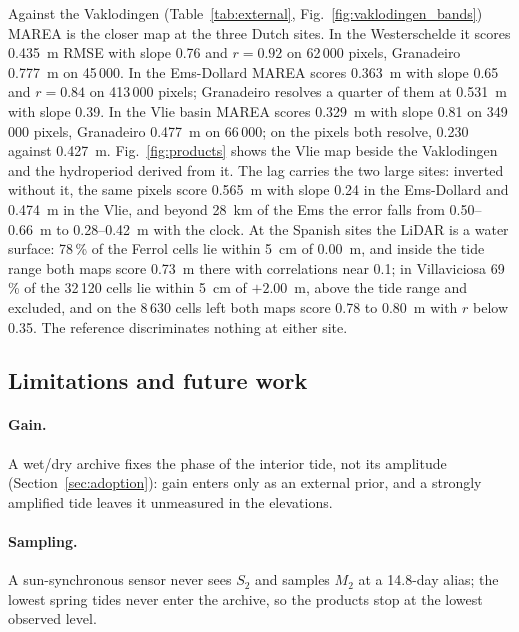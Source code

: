 

Against the Vaklodingen (Table~\ref{tab:external},
Fig.~\ref{fig:vaklodingen_bands}) MAREA is the closer map at the three
Dutch sites. In the Westerschelde it scores 0.435~m RMSE with slope 0.76
and $r = 0.92$ on 62\,000 pixels, Granadeiro 0.777~m on 45\,000. In the
Ems-Dollard MAREA scores 0.363~m with slope 0.65 and $r = 0.84$ on
413\,000 pixels; Granadeiro resolves a quarter of them at 0.531~m with
slope 0.39. In the Vlie basin MAREA scores 0.329~m with slope 0.81 on
349\,000 pixels, Granadeiro 0.477~m on 66\,000; on the pixels both
resolve, 0.230 against 0.427~m. Fig.~\ref{fig:products} shows the Vlie
map beside the Vaklodingen and the hydroperiod derived from it. The lag
carries the two large sites:
inverted without it, the same pixels score 0.565~m with slope 0.24 in
the Ems-Dollard and 0.474~m in the Vlie, and beyond 28~km of the Ems the
error falls from 0.50--0.66~m to 0.28--0.42~m with the clock.
At the Spanish sites the LiDAR is a water surface: 78\,\% of the Ferrol
cells lie within 5~cm of 0.00~m, and inside the tide range both maps
score 0.73~m there with correlations near 0.1; in Villaviciosa 69\,\% of
the 32\,120 cells lie within 5~cm of $+2.00$~m, above the tide range
and excluded, and on the 8\,630 cells left both maps score 0.78 to
0.80~m with $r$ below 0.35. The reference discriminates nothing at
either site.

\subsection{Limitations and future work}\label{sec:limitations}

\paragraph{Gain.} A wet/dry archive fixes the phase of the interior tide,
not its amplitude (Section~\ref{sec:adoption}): gain enters only as an
external prior, and a strongly amplified tide leaves it unmeasured in the
elevations.

\paragraph{Sampling.} A sun-synchronous sensor never sees $S_2$ and
samples $M_2$ at a 14.8-day alias; the lowest spring tides never enter
the archive, so the products stop at the lowest observed level.

